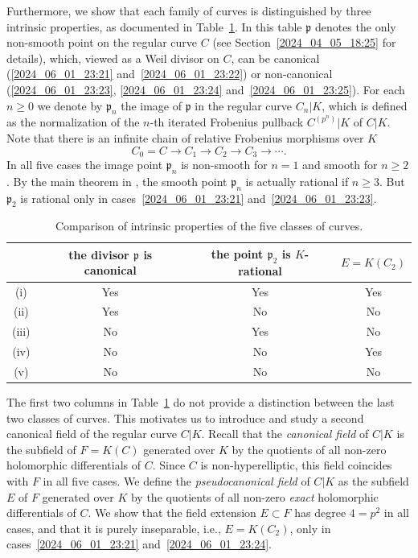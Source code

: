 \documentclass[12pt,reqno]{amsart}
\theoremstyle{definition}
\newcommand{\su}{\subset}
\newcommand{\pp}{\mathfrak{p}}
\begin{document}
Furthermore, we show that each family of curves is distinguished by three intrinsic properties, as documented in Table~\ref{2025_04_03_02:45}.
In this table $\pp$ denotes the only non-smooth point on the regular curve $C$ (see Section~\ref{2024_04_05_18:25} for details), which, viewed as a Weil divisor on $C$, can be canonical (\ref{2024_06_01_23:21} and~\ref{2024_06_01_23:22}) or non-canonical (\ref{2024_06_01_23:23}, \ref{2024_06_01_23:24} and~\ref{2024_06_01_23:25}).
For each $n\geq 0$ we denote by $\pp_n$ the image of $\pp$ in the regular curve $C_n|K$, which is defined as the normalization of the $n$-th iterated Frobenius pullback $C^{(p^n)}|K$ of $C|K$.
Note that there is an infinite chain of relative Frobenius morphisms over $K$
\[ C_0 = C \to C_1 \to C_2 \to C_3 \to \cdots. \]
In all five cases the image point $\pp_n$ is non-smooth for $n=1$ and smooth for $n \geq 2$. By the main theorem in \cite{HiSt22}, the smooth point $\pp_n$ is actually rational if $n \geq 3$.
But $\pp_2$ is rational only in cases~\ref{2024_06_01_23:21} and~\ref{2024_06_01_23:23}.

\addtolength{\tabcolsep}{6pt}
\begin{table}[h]
\begin{center}
\begin{tabular}{c c c c}
    \hline
    & the divisor $\pp$ is canonical & the point $\pp_2$ is $K$-rational & $E=K(C_2)$ \\ \hline
    (i) & Yes & Yes & Yes \\
    (ii) & Yes & No & No \\
    (iii) & No & Yes & No \\ 
    (iv) & No & No & Yes \\
    (v) & No & No & No \\
    \hline
\end{tabular}
\vspace{\abovecaptionskip}
\caption{Comparison of intrinsic properties of the five classes of curves.}
\label{2025_04_03_02:45}
\end{center}
\end{table}

The first two columns in Table~\ref{2025_04_03_02:45} do not provide a distinction between the last two classes of curves.
This motivates us to introduce and study a second canonical field of the regular curve $C|K$.
Recall that the \emph{canonical field} of $C|K$ is the subfield of $F=K(C)$ generated over $K$ by the quotients of all non-zero holomorphic differentials of $C$.
Since $C$ is non-hyperelliptic, this field coincides with $F$ in all five cases.
We define the \emph{pseudocanonical field} of $C|K$ as the subfield $E$ of $F$ generated over $K$ by the quotients of all non-zero \emph{exact} holomorphic differentials of $C$.
We show that the field extension $E\su F$ has degree $4=p^2$ in all cases, and that it is purely inseparable, i.e., $E=K(C_2)$, only in cases~\ref{2024_06_01_23:21} and~\ref{2024_06_01_23:24}.
\end{document}
